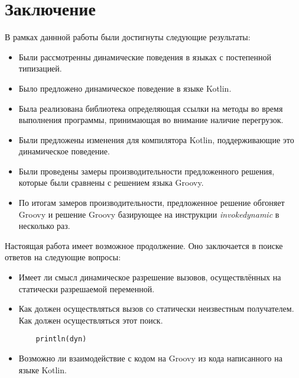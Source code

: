 \vfill
\clearpage
\section*{Заключение}



В рамках даннной работы были достигнуты следующие результаты:

\begin{itemize}
    \item Были рассмотренны динамические поведения в языках с постепенной типизацией.
    \item Было предложено динамическое поведение в языке Kotlin.
    \item Была реализована библиотека определяющая ссылки на методы во время выполнения программы, принимающая во внимание наличие перегрузок.
    \item Были предложены изменения для компилятора Kotlin, поддерживающие это динамическое поведение.
    \item Были проведены замеры производительности предложенного решения, которые были сравнены с решением языка Groovy.
        \item По итогам замеров производительности, предложенное решение обгоняет Groovy и решение Groovy базирующее на инструкции \textit{invokedynamic} в несколько раз.
\end{itemize}

Настоящая работа имеет возможное продолжение. Оно заключается в поиске ответов на следующие вопросы:

\begin{itemize}
    \item Имеет ли смысл динамическое разрешение вызовов, осуществлённых на статически разрешаемой переменной.
    \item Как должен осуществляться вызов со статически неизвестным получателем. Как должен осуществляться этот поиск. 
    \begin{verbatim}
    println(dyn)
\end{verbatim}
    \item Возможно ли взаимодействие с кодом на Groovy из кода написанного на языке Kotlin.
\end{itemize}
